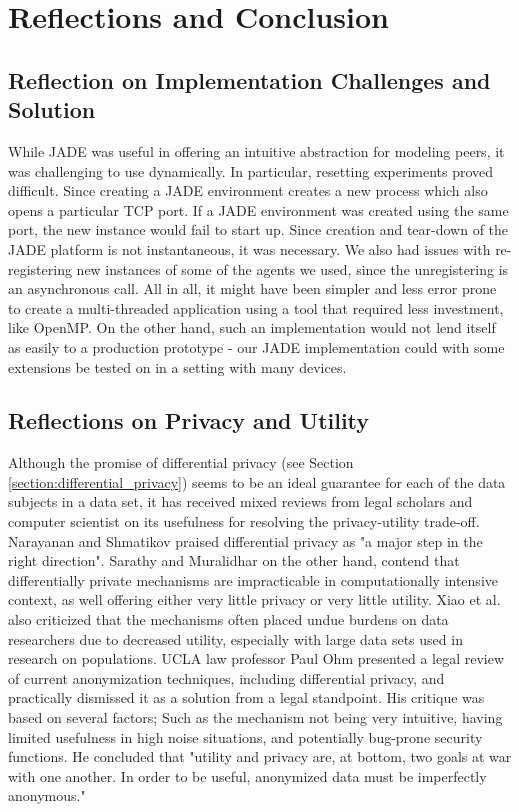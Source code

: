 
\chapter{Reflections and Conclusion}

\section{Reflection on Implementation Challenges and Solution}
While JADE was useful in offering an intuitive abstraction for modeling peers, it was challenging to use dynamically. In particular, resetting experiments proved difficult. Since creating a JADE environment creates a new process which also opens a particular TCP port. If a JADE environment was created using the same port, the new instance would fail to start up. Since creation and tear-down of the JADE platform is not instantaneous, it was necessary. We also had issues with re-registering new instances of some of the agents we used, since the unregistering is an asynchronous call. All in all, it might have been simpler and less error prone to create a multi-threaded application using a tool that required less investment, like OpenMP. On the other hand, such an implementation would not lend itself as easily to a production prototype - our JADE implementation could with some extensions be tested on in a setting with many devices.

\section{Reflections on Privacy and Utility } \label{sec:privacy_utility_reflection}

Although the promise of differential privacy (see Section \ref{section:differential_privacy}) seems to be an ideal guarantee for each of the data subjects in a data set, it has received mixed reviews from legal scholars and computer scientist on its usefulness for resolving the privacy-utility trade-off. Narayanan and Shmatikov praised differential privacy as "a major step in the right direction\citep{narayanan2010myths}". Sarathy and Muralidhar on the other hand, contend that differentially private mechanisms are impracticable in computationally intensive context, as well offering either very little privacy or very little utility\citep{Sarathy2011evaluating}. Xiao et al. also criticized that the mechanisms often placed undue burdens on data researchers due to decreased utility, especially with large data sets used in research on populations\citep{xiao2011differential}. UCLA law professor Paul Ohm presented a legal review of current anonymization techniques, including differential privacy, and practically dismissed it as a solution from a legal standpoint. His critique was based on several factors; Such as the mechanism not being very intuitive, having limited usefulness in high noise situations, and potentially bug-prone security functions. He concluded that "utility and privacy are, at bottom, two goals at war with one another. In order to be useful, anonymized data must be imperfectly anonymous\citep{ohm2010brokenPrivacyPromise}."

